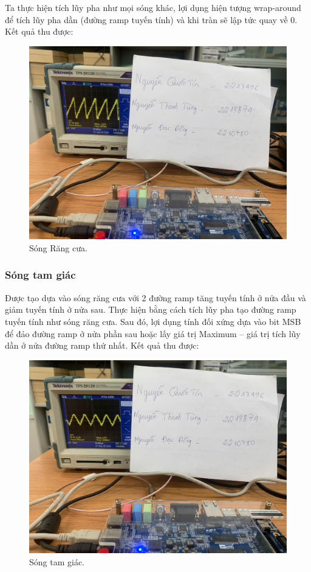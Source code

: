 Ta thực hiện tích lũy pha như mọi sóng khác, lợi dụng hiện tượng wrap-around để tích lũy pha dần (đường ramp tuyến tính) và khi tràn sẽ lập tức quay về 0. Kết quả thu được:

\begin{figure}[H]
	\centering
	\includegraphics[width=\linewidth]{./my-chapters/my-images/Gen_wave/hinh4.jpg}
	\caption{Sóng Răng cưa.}
	\label{f: sawtooth_wave}
\end{figure}

\subsubsection{Sóng tam giác}

Được tạo dựa vào sóng răng cưa với 2 đường ramp tăng tuyến tính ở nửa đầu và giảm tuyến tính ở nửa sau. Thực hiện bằng cách tích lũy pha tạo đường ramp tuyến tính như sóng răng cưa. Sau đó, lợi dụng tính đối xứng dựa vào bit MSB để đảo đường ramp ở nửa phần sau hoặc lấy giá trị Maximum – giá trị tích lũy dần ở nửa đường ramp thứ nhất. Kết quả thu được:

\begin{figure}[H]
	\centering
	\includegraphics[width=\linewidth]{./my-chapters/my-images/Gen_wave/hinh5.jpg}
	\caption{Sóng tam giác.}
	\label{f: triangle_wave}
\end{figure}
